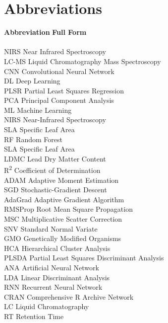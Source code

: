 \documentclass[12pt,a4paper]{article}
\begin{document}
\newpage
\tableofcontents


\newpage
\section*{Abbreviations}
\begin{tabbing}
    \textbf{Abbreviation} \hspace{2cm} \= \textbf{Full Form} \\ 
  \\

    NIRS \> Near Infrared Spectroscopy \\
    LC-MS \> Liquid Chromatography Mass Spectroscopy \\
    CNN \> Convolutional Neural Network \\
    DL \> Deep Learning \\
    PLSR \> Partial Least Squares Regression \\
    PCA \> Principal Component Analysis \\
    ML \> Machine Learning \\
    NIRS \> Near-Infrared Spectroscopy \\
    SLA \> Specific Leaf Area \\
    RF \> Random Forest \\
    SLA \> Specific Leaf Area \\
    LDMC \> Lead Dry Matter Content \\
    R\textsuperscript{2} \> Coefficient of Determination \\
    ADAM \> Adaptive Moment Estimation \\
    SGD \> Stochastic-Gradient Descent \\
    AdaGrad \> Adaptive Gradient Algorithm \\
    RMSProp \> Root Mean Square Propagation \\
    MSC \> Multiplicative Scatter Correction \\
    SNV \> Standard Normal Variate \\
    GMO \> Genetically Modified Organisms \\
    HCA \> Hierarchical Cluster Analysis \\
    PLSDA  \> Partial Least Squares Discriminant Analysis \\
    ANA \>  Artificial Neural Network \\
    LDA \> Linear Discriminant Analysis \\
    RNN \> Recurrent Neural Network \\
    CRAN \> Comprehensive R Archive Network \\
    LC \> Liquid Chromatography \\
    RT \> Retention Time \\

\end{tabbing}
\end{document}
